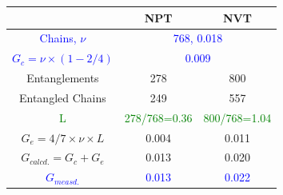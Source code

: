 \documentclass[12pt, dvipdfmx]{beamer}
\begin{document}
\begin{frame}
\begin{columns}[onlytextwidth]
		\scriptsize
			\centering
			\begin{tabular}{c|c|c} \hline
				&NPT & NVT \\ \hline \hline
				\textcolor{blue}{Chains, $\nu$} & \multicolumn{2}{|c}{\textcolor{blue}{768, 0.018}}\\ \hline
				\textcolor{blue}{$G_c = \nu \times (1-2/4)$}&\multicolumn{2}{|c}{\textcolor{blue}{0.009}} \\ \hline \hline
				Entanglements& 278& 800\\ \hline
				Entangled Chains&249&557 \\ \hline
				\textcolor{green}{L} & \textcolor{green}{278/768=0.36} & \textcolor{green}{800/768=1.04} \\ \hline
				$G_e=4/7 \times \nu \times L $ & 0.004 & 0.011 \\ \hline \hline
				\alert{$G_{calcd.}=G_c + G_e$} & \alert{0.013} & \alert{0.020} \\ \hline \hline
				\textcolor{blue}{$G_{measd.}$} & \textcolor{blue}{0.013} & \textcolor{blue}{0.022} \\ \hline
			\end{tabular}
	\end{columns}
\end{frame}
\end{document}
